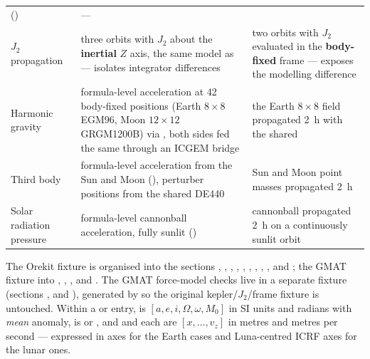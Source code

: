 \begin{table}[htbp]
\begin{tabularx}{\textwidth}{@{}l L L@{}}
      () &
      --- \\
    $J_2$ propagation &
      three orbits with $J_2$ about the \textbf{inertial} $Z$ axis, the same
      model as \lupnt{} --- isolates integrator differences &
      two orbits with $J_2$ evaluated in the \textbf{body-fixed} frame ---
      exposes the modelling difference \\
    Harmonic gravity &
      formula-level acceleration at 42 body-fixed positions (Earth $8\times8$
      EGM96, Moon $12\times12$ GRGM1200B) via
      , both sides fed the same
       through an ICGEM bridge &
      the Earth $8\times8$ field propagated \SI{2}{\hour} with the shared
       \\
    Third body &
      formula-level acceleration from the Sun and Moon
      (), perturber positions from the shared
      DE440 &
      Sun and Moon point masses propagated \SI{2}{\hour} \\
    Solar radiation pressure &
      formula-level cannonball acceleration, fully sunlit
      () &
      cannonball propagated \SI{2}{\hour} on a continuously sunlit orbit \\
    \bottomrule
  \end{tabularx}
\end{table}

The Orekit fixture is organised into the sections ,
, , , ,
, , ,
,  and
; the GMAT fixture
 into ,
, ,  and .
The GMAT force-model checks live in a separate fixture
 (sections
,  and
), generated by
 so the original
kepler/$J_2$/frame fixture is untouched. Within a  or
 entry,  is
$[a, e, i, \Omega, \omega, M_0]$ in SI units and radians with \emph{mean}
anomaly,  is  or , and  and
each  are $[x,\dots,v_z]$ in metres and metres per
second --- expressed in  axes for the Earth cases and
Luna-centred ICRF axes for the lunar ones.

